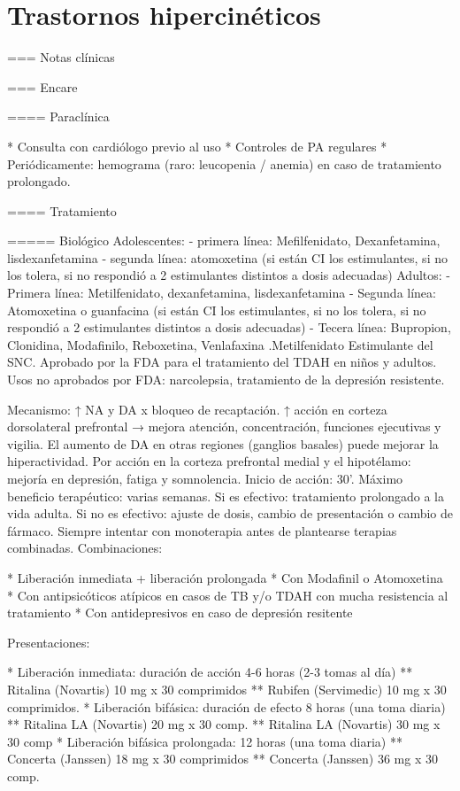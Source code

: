 \chapter{Trastornos hipercinéticos}

=== Notas clínicas

=== Encare

==== Paraclínica

* Consulta con cardiólogo previo al uso
* Controles de PA regulares
* Periódicamente: hemograma (raro: leucopenia / anemia) en caso de tratamiento prolongado.

==== Tratamiento

===== Biológico
Adolescentes: 
- primera línea: Mefilfenidato, Dexanfetamina, lisdexanfetamina
- segunda línea: atomoxetina (si están CI los estimulantes, si no los tolera, si no respondió a 2 estimulantes distintos a dosis adecuadas)
Adultos:
- Primera línea: Metilfenidato, dexanfetamina, lisdexanfetamina
- Segunda línea: Atomoxetina o guanfacina (si están CI los estimulantes, si no los tolera, si no respondió a 2 estimulantes distintos a dosis adecuadas)
- Tecera línea: Bupropion, Clonidina, Modafinilo, Reboxetina, Venlafaxina
.Metilfenidato
Estimulante del SNC.
Aprobado por la FDA para el tratamiento del TDAH en niños y adultos.
Usos no aprobados por FDA: narcolepsia, tratamiento de la depresión resistente.

Mecanismo: ↑ NA y DA x bloqueo de recaptación. ↑ acción en corteza dorsolateral prefrontal → mejora atención, concentración, funciones ejecutivas y vigilia. El aumento de DA en otras regiones (ganglios basales) puede mejorar la hiperactividad. Por acción en la corteza prefrontal medial y el hipotélamo: mejoría en depresión, fatiga y somnolencia.
Inicio de acción: 30'. Máximo beneficio terapéutico: varias semanas.
Si es efectivo: tratamiento prolongado a la vida adulta.
Si no es efectivo: ajuste de dosis, cambio de presentación o cambio de fármaco.
Siempre intentar con monoterapia antes de plantearse terapias combinadas.
Combinaciones:

* Liberación inmediata + liberación prolongada
* Con Modafinil o Atomoxetina
* Con antipsicóticos atípicos en casos de TB y/o TDAH con mucha resistencia al tratamiento
* Con antidepresivos en caso de depresión resitente

Presentaciones:

* Liberación inmediata: duración de acción 4-6 horas (2-3 tomas al día)
** Ritalina (Novartis) 10 mg x 30 comprimidos
** Rubifen (Servimedic) 10 mg x 30 comprimidos.
* Liberación bifásica: duración de efecto 8 horas (una toma diaria)
** Ritalina LA (Novartis) 20  mg x 30 comp.
** Ritalina LA (Novartis) 30 mg x 30 comp
* Liberación bifásica  prolongada: 12 horas (una toma diaria)
** Concerta (Janssen) 18 mg x 30 comprimidos
** Concerta (Janssen) 36 mg x 30 comp.


